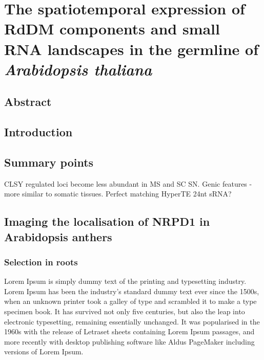 
\chapter{The spatiotemporal expression of RdDM components and small RNA landscapes in the germline of \textit{Arabidopsis thaliana}}

\ifpdf
    \graphicspath{{Chapter2/Figs/Raster/}{Chapter2/Figs/PDF/}{Chapter2/Figs/}}
\else
    \graphicspath{{Chapter2/Figs/Vector/}{Chapter2/Figs/}}
\fi


\section{Abstract}



\section{Introduction}


\section{Summary points}

CLSY regulated loci become less abundant in MS and SC SN. 
Genic features - more similar to somatic tissues.
Perfect matching HyperTE 24nt sRNA?



\section{Imaging the localisation of NRPD1 in Arabidopsis anthers}
\subsection{Selection in roots}
Lorem Ipsum is simply dummy text of the printing and typesetting industry. Lorem Ipsum has been the industry's standard dummy text ever since the 1500s, when an unknown printer took a galley of type and scrambled it to make a type specimen book. It has survived not only five centuries, but also the leap into electronic typesetting, remaining essentially unchanged. It was popularised in the 1960s with the release of Letraset sheets containing Lorem Ipsum passages, and more recently with desktop publishing software like Aldus PageMaker including versions of Lorem Ipsum.

